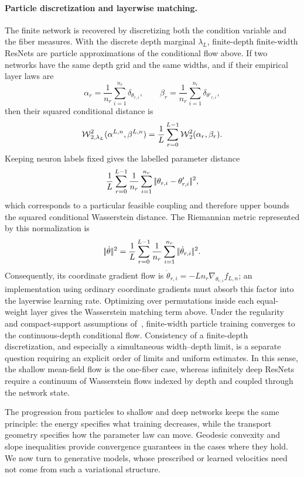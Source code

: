 \paragraph{Particle discretization and layerwise matching.}
The finite network is recovered by discretizing both the condition variable and the fiber measures. With the discrete depth marginal $\lambda_L$, finite-depth finite-width ResNets are particle approximations of the conditional flow above. If two networks have the same depth grid and the same widths, and if their empirical layer laws are
\[
	\alpha_r=\frac1{n_r}\sum_{i=1}^{n_r}\delta_{\theta_{r,i}},
	\qquad
	\beta_r=\frac1{n_r}\sum_{i=1}^{n_r}\delta_{\theta'_{r,i}},
\]
then their squared conditional distance is
\[
	\operatorname{\mathcal{W}}_{2,\lambda_L}^2(\alpha^{L,n},\beta^{L,n})
	=
	\frac1L\sum_{r=0}^{L-1} \operatorname{\mathcal{W}}_2^2(\alpha_r,\beta_r).
\]
Keeping neuron labels fixed gives the labelled parameter distance
\[
	\frac1L\sum_{r=0}^{L-1}\frac1{n_r}
	\sum_{i=1}^{n_r}|\!| \theta_{r,i}-\theta'_{r,i} |\!|^2,
\]
which corresponds to a particular feasible coupling and therefore upper bounds the squared conditional Wasserstein distance. The Riemannian metric represented by this normalization is
\[
	|\!| \dot\theta |\!|^2
	=
	\frac1L\sum_{r=0}^{L-1}\frac1{n_r}
	\sum_{i=1}^{n_r}|\!| \dot\theta_{r,i} |\!|^2.
\]
Consequently, its coordinate gradient flow is \(\dot\theta_{r,i}=-Ln_r\nabla_{\theta_{r,i}}f_{L,n}\); an implementation using ordinary coordinate gradients must absorb this factor into the layerwise learning rate. Optimizing over permutations inside each equal-weight layer gives the Wasserstein matching term above. Under the regularity and compact-support assumptions of~\citet{BarboniPeyreVialard2024ConditionalResNets}, finite-width particle training converges to the continuous-depth conditional flow. Consistency of a finite-depth discretization, and especially a simultaneous width--depth limit, is a separate question requiring an explicit order of limits and uniform estimates. In this sense, the shallow mean-field flow is the one-fiber case, whereas infinitely deep ResNets require a continuum of Wasserstein flows indexed by depth and coupled through the network state.

The progression from particles to shallow and deep networks keeps the same principle: the energy specifies what training decreases, while the transport geometry specifies how the parameter law can move. Geodesic convexity and slope inequalities provide convergence guarantees in the cases where they hold. We now turn to generative models, whose prescribed or learned velocities need not come from such a variational structure.

\FloatBarrier
